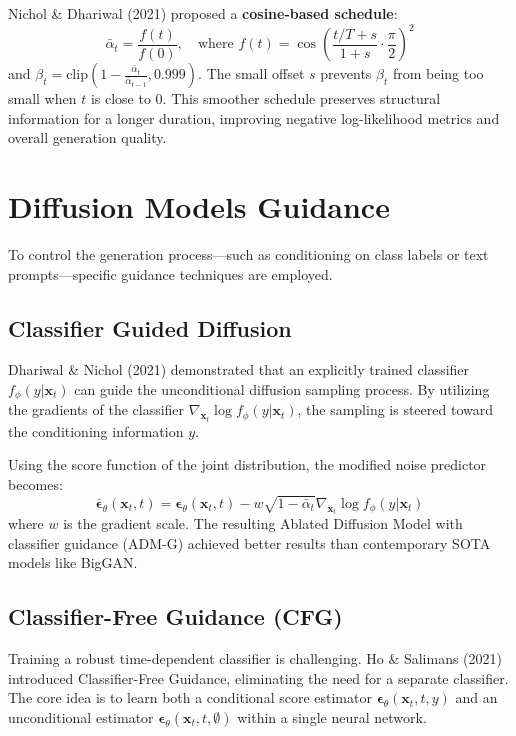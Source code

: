Nichol \& Dhariwal (2021) proposed a \textbf{cosine-based schedule}:
\begin{equation}
    \bar{\alpha}_t = \frac{f(t)}{f(0)}, \quad \text{where } f(t) = \cos\left( \frac{t/T + s}{1 + s} \cdot \frac{\pi}{2} \right)^2
\end{equation}
and $\beta_t = \text{clip}(1 - \frac{\bar{\alpha}_t}{\bar{\alpha}_{t-1}}, 0.999)$. The small offset $s$ prevents $\beta_t$ from being too small when $t$ is close to 0. This smoother schedule preserves structural information for a longer duration, improving negative log-likelihood metrics and overall generation quality.

\section{Diffusion Models Guidance}

To control the generation process—such as conditioning on class labels or text prompts—specific guidance techniques are employed.

\subsection{Classifier Guided Diffusion}

Dhariwal \& Nichol (2021) demonstrated that an explicitly trained classifier $f_\phi(y|\mathbf{x}_t)$ can guide the unconditional diffusion sampling process. By utilizing the gradients of the classifier $\nabla_{\mathbf{x}_t} \log f_\phi(y|\mathbf{x}_t)$, the sampling is steered toward the conditioning information $y$.

Using the score function of the joint distribution, the modified noise predictor becomes:
\begin{equation}
    \bar{\boldsymbol{\epsilon}}_\theta(\mathbf{x}_t, t) = \boldsymbol{\epsilon}_\theta(\mathbf{x}_t, t) - w \sqrt{1 - \bar{\alpha}_t} \nabla_{\mathbf{x}_t} \log f_\phi(y|\mathbf{x}_t)
\end{equation}
where $w$ is the gradient scale. The resulting Ablated Diffusion Model with classifier guidance (ADM-G) achieved better results than contemporary SOTA models like BigGAN.

\subsection{Classifier-Free Guidance (CFG)}

Training a robust time-dependent classifier is challenging. Ho \& Salimans (2021) introduced Classifier-Free Guidance, eliminating the need for a separate classifier. The core idea is to learn both a conditional score estimator $\boldsymbol{\epsilon}_\theta(\mathbf{x}_t, t, y)$ and an unconditional estimator $\boldsymbol{\epsilon}_\theta(\mathbf{x}_t, t, \emptyset)$ within a single neural network.


